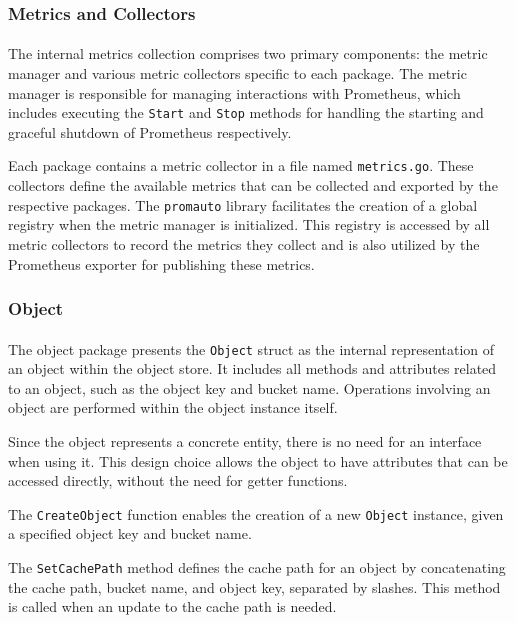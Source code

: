 \documentclass[12pt, conference, final, a4paper, onecolumn, compsoc]{IEEEtran}
\begin{document}
\subsubsection*{Metrics and Collectors}
\paragraph{}

The internal metrics collection comprises two primary components: the metric
manager and various metric collectors specific to each package. The metric
manager is responsible for managing interactions with Prometheus, which includes
executing the \texttt{Start} and \texttt{Stop} methods for handling the starting
and graceful shutdown of Prometheus respectively.

Each package contains a metric collector in a file named \texttt{metrics.go}.
These collectors define the available metrics that can be collected and exported
by the respective packages. The \texttt{promauto} library facilitates the
creation of a global registry when the metric manager is initialized. This
registry is accessed by all metric collectors to record the metrics they collect
and is also utilized by the Prometheus exporter for publishing these metrics.

\subsubsection*{Object}
\paragraph{}

The object package presents the \texttt{Object} struct as the internal
representation of an object within the object store. It includes all methods and
attributes related to an object, such as the object key and bucket name.
Operations involving an object are performed within the object instance itself.

Since the object represents a concrete entity, there is no need for an interface
when using it. This design choice allows the object to have attributes that can
be accessed directly, without the need for getter functions.

The \texttt{CreateObject} function enables the creation of a new \texttt{Object}
instance, given a specified object key and bucket name.

The \texttt{SetCachePath} method defines the cache path for an object by
concatenating the cache path, bucket name, and object key, separated by slashes.
This method is called when an update to the cache path is needed.
\end{document}

